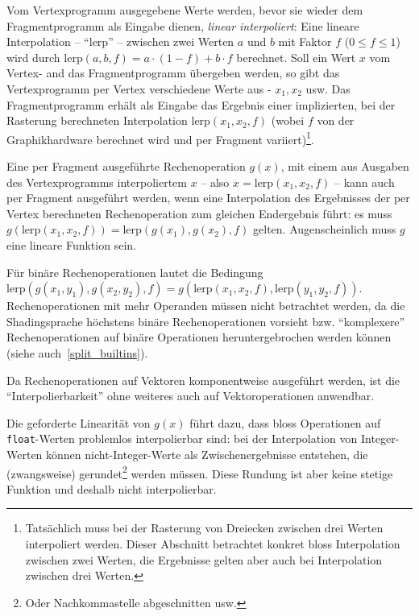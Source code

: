 \documentclass[twoside,a4paper,fleqn,12pt]{article}
\begin{document}
\newcommand\lerp{\mathrm{lerp}}
Vom Vertexprogramm ausgegebene Werte werden, bevor sie wieder dem Fragmentprogramm als Eingabe dienen, \emph{linear interpoliert}: %
Eine lineare Interpolation -- "`$\lerp$"' -- zwischen zwei Werten $a$ und $b$ mit Faktor $f$ ($0 \le f \le 1$) wird durch $\lerp(a, b, f) = a \cdot (1-f) + b \cdot f$ berechnet.
Soll ein Wert $x$ vom Vertex- and das Fragmentprogramm übergeben werden, so gibt das Vertexprogramm per Vertex verschiedene Werte aus - $x_1, x_2$ usw.
Das Fragmentprogramm erhält als Eingabe das Ergebnis einer implizierten, bei der Rasterung berechneten Interpolation $\lerp(x_1, x_2, f)$ (wobei $f$ von der Graphikhardware berechnet wird
und per Fragment variiert)\footnote{Tatsächlich muss bei der Rasterung von Dreiecken zwischen drei Werten interpoliert werden. Dieser Abschnitt betrachtet konkret
bloss Interpolation zwischen zwei Werten, die Ergebnisse gelten aber auch bei Interpolation zwischen drei Werten.}.

Eine per Fragment ausgeführte Rechenoperation $g(x)$, mit einem aus Ausgaben des Vertexprogramms interpoliertem $x$ -- also $x = \lerp(x_1, x_2, f)$ --
kann auch per Fragment ausgeführt werden, wenn eine Interpolation des Ergebnisses der per Vertex berechneten Rechenoperation zum gleichen Endergebnis führt:
es muss $g(\lerp(x_1, x_2, f)) = \lerp (g(x_1), g(x_2), f)$ gelten. Augenscheinlich muss $g$ eine lineare Funktion sein.

Für binäre Rechenoperationen lautet die Bedingung $\lerp (g (x_1, y_1), g (x_2, y_2), f) = g (\lerp (x_1, x_2, f), \lerp (y_1, y_2, f))$.
Rechenoperationen mit mehr Operanden müssen nicht betrachtet werden, da die Shadingsprache höchstens
binäre Rechenoperationen vorsieht bzw. "`komplexere"' Rechenoperationen auf binäre Operationen heruntergebrochen werden
können (siehe auch~\ref{split_builtins}). %

Da Rechenoperationen auf Vektoren komponentweise ausgeführt werden,  ist die "`Interpolierbarkeit"' ohne weiteres auch auf Vektoroperationen anwendbar.

Die geforderte Linearität von $g(x)$ führt dazu, dass bloss Operationen auf \texttt{float}-Werten problemlos interpolierbar sind:
bei der Interpolation von Integer-Werten können nicht-Integer-Werte als Zwischenergebnisse entstehen,
die (zwangsweise) gerundet\footnote{Oder Nachkommastelle abgeschnitten usw.} werden müssen. Diese Rundung
ist aber keine stetige Funktion und deshalb nicht interpolierbar.
\end{document}
